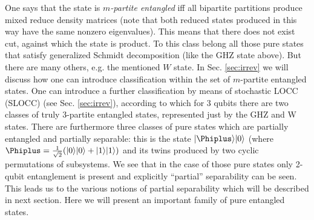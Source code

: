 \documentclass[twocolumn,aps,rmp]{revtex4}
\begin{document}
One says that the state is {\it $m$-partite
entangled} iff
all bipartite partitions produce mixed reduce density matrices (note
that both reduced states produced in this way have the same nonzero
eigenvalues). This means that there does not exist cut, against
which the state is product. To this class belong all those pure
states that satisfy generalized Schmidt decomposition (like the GHZ
state above). But there are many others, e.g. the mentioned $W$
state. In Sec. \ref{sec:irrev} we will discuss how one can
introduce classification within the set of $m$-partite entangled
states. One can introduce a further classification by means of
stochastic LOCC (SLOCC) (see Sec. \ref{sec:irrev}),
according to which for $3$ qubits there are two classes of truly
$3$-partite entangled states, represented just by the GHZ and W
states. There are furthermore three classes of pure states which are
partially entangled and partially separable: this is the state
$|\Phiplus\rangle|0\rangle$ (where
$\Phiplus=\frac{1}{\sqrt{2}}(|0\rangle|0\rangle +
|1\rangle|1\rangle)$ and its twins produced by two cyclic
permutations of subsystems. We see that in the case of those pure
states only 2-qubit entanglement is present and explicitly
``partial'' separability can be seen. This leads us to the various
notions of partial separability which will be described in next
section. Here we will present an important family of pure entangled
states.
\end{document}
